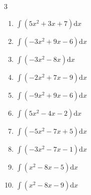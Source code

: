 \begin{multicols}{3}
\begin{enumerate}

\columnbreak %

  \item $\displaystyle \int \left( 5x^{2}+3x+7 \right) \mathrm{d}x$


  \item $\displaystyle \int \left( -3x^{2}+9x-6 \right) \mathrm{d}x$


  \item $\displaystyle \int \left( -3x^{2}-8x \right) \mathrm{d}x$


  \item $\displaystyle \int \left( -2x^{2}+7x-9 \right) \mathrm{d}x$


  \item $\displaystyle \int \left( -9x^{2}+9x-6 \right) \mathrm{d}x$


  \item $\displaystyle \int \left( 5x^{2}-4x-2 \right) \mathrm{d}x$


  \item $\displaystyle \int \left( -5x^{2}-7x+5 \right) \mathrm{d}x$


  \item $\displaystyle \int \left( -3x^{2}-7x-1 \right) \mathrm{d}x$


  \item $\displaystyle \int \left( x^{2}-8x-5 \right) \mathrm{d}x$


  \item $\displaystyle \int \left( x^{2}-8x-9 \right) \mathrm{d}x$


\end{enumerate}
\end{multicols}
